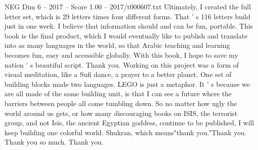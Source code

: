 \begin{textsample}{NEG Dim 6 – 2017 – Score 1.00 – 2017/t000607.txt}
Ultimately, I created the full letter set, which is 29 letters times four different forms.
That ' s 116 letters build just in one week.
I believe that information should and can be fun, portable.
This book is the final product, which I would eventually like to publish and translate into as many languages in the world, so that Arabic teaching and learning becomes fun, easy and accessible globally.
With this book, I hope to save my nation ' s beautiful script.
Thank you.
Working on this project was a form of visual meditation, like a Sufi dance, a prayer to a better planet.
One set of building blocks made two languages.
LEGO is just a metaphor.
It ' s because we are all made of the same building unit, is that I can see a future where the barriers between people all come tumbling down.
So no matter how ugly the world around us gets, or how many discouraging books on ISIS, the terrorist group, and not Isis, the ancient Egyptian goddess, continue to be published, I will keep building one colorful world.
Shukran, which means"thank you."Thank you.
Thank you so much.
Thank you.

\end{textsample}
